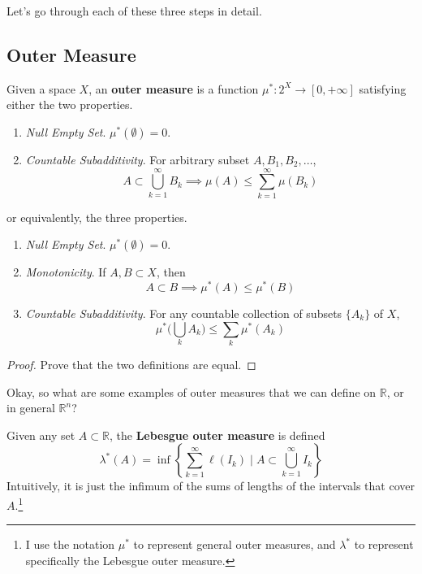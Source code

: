   Let's go through each of these three steps in detail. 

\subsection{Outer Measure} 

  \begin{definition}
    Given a space $X$, an \textbf{outer measure} is a function $\mu^\ast : 2^X \to [0, +\infty]$ satisfying either the two properties. 
    \begin{enumerate}
      \item \textit{Null Empty Set}. $\mu^\ast(\emptyset) = 0$. 
      \item \textit{Countable Subadditivity}. For arbitrary subset $A, B_1, B_2, \ldots$, 
      \begin{equation}
        A \subset \bigcup_{k=1}^\infty B_k \implies \mu(A) \leq \sum_{k=1}^\infty \mu(B_k)
      \end{equation} 
    \end{enumerate}

    or equivalently, the three properties. 
    \begin{enumerate}
      \item \textit{Null Empty Set}. $\mu^\ast(\emptyset) = 0$. 
      \item \textit{Monotonicity}. If $A, B \subset X$, then 
      \begin{equation}
        A \subset B \implies \mu^\ast (A) \leq \mu^\ast (B)
      \end{equation}
      \item \textit{Countable Subadditivity}. For any countable collection of subsets $\{A_k\}$ of $X$, 
      \begin{equation}
        \mu^\ast \bigg( \bigcup_k A_k \bigg) \leq \sum_{k} \mu^\ast (A_k) 
      \end{equation}
    \end{enumerate}
  \end{definition}
  \begin{proof}
    Prove that the two definitions are equal. 
  \end{proof} 

  Okay, so what are some examples of outer measures that we can define on $\mathbb{R}$, or in general $\mathbb{R}^n$? 

  \begin{definition}
    Given any set $A \subset \mathbb{R}$, the \textbf{Lebesgue outer measure} is defined 
    \begin{equation}
      \lambda^\ast (A) = \inf  \left\{ \sum_{k=1}^\infty \ell (I_k) \; \bigg| \; A \subset \bigcup_{k=1}^\infty I_k \right\} 
    \end{equation}
    Intuitively, it is just the infimum of the sums of lengths of the intervals that cover $A$.\footnote{I use the notation $\mu^\ast$ to represent general outer measures, and $\lambda^\ast$ to represent specifically the Lebesgue outer measure.} 
  \end{definition} 

